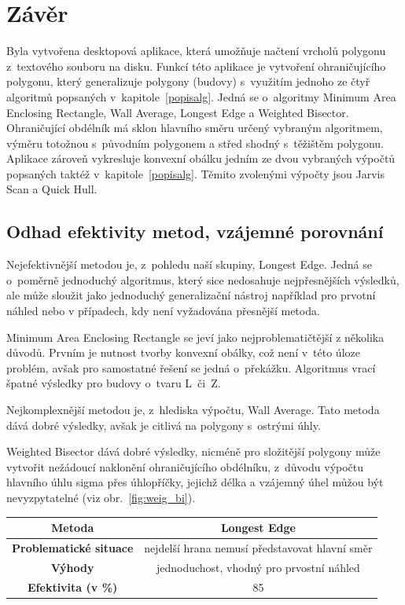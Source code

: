 \documentclass[a4paper, 12pt, oneside, titlepage]{article} %
\begin{document}
\section{Závěr}
Byla vytvořena desktopová aplikace, která umožňuje načtení vrcholů polygonu z~textového souboru na disku. Funkcí této aplikace je vytvoření ohraničujícího polygonu, který generalizuje polygony (budovy) s~využitím jednoho ze čtyř algoritmů popsaných v~kapitole~\ref{popisalg}. Jedná se o~algoritmy Minimum Area Enclosing Rectangle, Wall Average, Longest Edge a Weighted Bisector. Ohraničující obdélník má sklon hlavního směru určený vybraným algoritmem, výměru totožnou s~původním polygonem a střed shodný s~těžištěm polygonu. Aplikace zároveň vykresluje konvexní obálku jedním ze dvou vybraných výpočtů popsaných taktéž v~kapitole~\ref{popisalg}. Těmito zvolenými výpočty jsou Jarvis Scan a Quick Hull.

\subsection{Odhad efektivity metod, vzájemné porovnání}
Nejefektivnější metodou je, z~pohledu naší skupiny, Longest Edge. Jedná se o~poměrně jednoduchý algoritmus, který sice nedosahuje nejpřesnějších výsledků, ale může sloužit jako jednoduchý generalizační nástroj například pro prvotní náhled nebo v případech, kdy není vyžadována přesnější metoda. 

Minimum Area Enclosing Rectangle se jeví jako nejproblematičtější z několika důvodů. Prvním je nutnost tvorby konvexní obálky, což není v~této úloze problém, avšak pro samostatné řešení se jedná o~překážku. Algoritmus vrací špatné výsledky pro budovy o~tvaru L~či~Z.

Nejkomplexnější metodou je, z~hlediska výpočtu, Wall Average. Tato metoda dává dobré výsledky, avšak je citlivá na polygony s~ostrými úhly. 

Weighted Bisector dává dobré výsledky, nicméně pro složitější polygony může vytvořit nežádoucí naklonění ohraničujícího obdélníku, z~důvodu výpočtu hlavního úhlu sigma přes úhlopříčky, jejichž délka a vzájemný úhel můžou být nevyzpytatelné (viz obr.~\ref{fig:weig_bi}).

\begin{table}[h!]
\centering
\begin{tabular}{|c|c|}
\hline
\textbf{Metoda}                & Longest Edge                                   \\ \hline
\textbf{Problematické situace} & nejdelší hrana nemusí představovat hlavní směr \\ \hline
\textbf{Výhody}                & jednoduchost, vhodný pro prvostní náhled       \\ \hline
\textbf{Efektivita (v \%)}     & 85                                             \\ \hline
\end{tabular}
\end{table}
\end{document}
